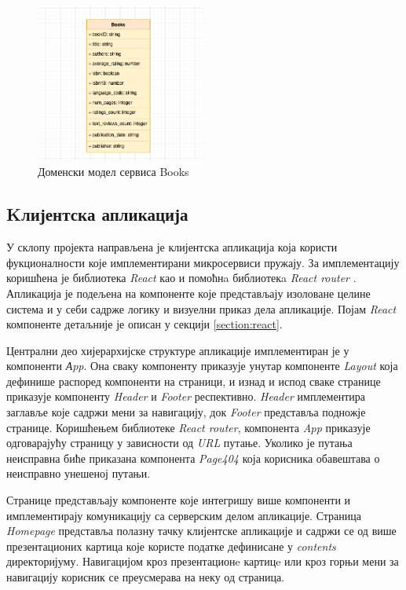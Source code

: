 \documentclass[12pt,oneside]{memoir}
\begin{document}
\begin{figure}[!ht]
  \centering
  \includegraphics[width=0.5\textwidth]{matfmaster/img/booksShema.png}
  \caption{Доменски модел сервиса Books}
  \label{fig:booksShema}
\end{figure}
\newpage

\newpage


\subsection{Kлијентска апликација}

У склопу пројекта направљена је клијентска апликација која користи фукционалности које имплементирани микросервиси пружају. За имплементацију коришћена је библиотека \textit{React} као и помоћнa библиотекa \textit{React router} \cite{reactRouter}. Апликација је подељена на компоненте које представљају изоловане целине система и у себи садрже логику и визуелни приказ дела апликације. Појам \textit{React} компоненте детаљније је описан у секцији \ref{section:react}.

Централни део хијерархијске структуре апликације имплементиран је у компоненти \textit{Аpp}. Она сваку компоненту приказује унутар компоненте \textit{Layout} која дефинише распоред компоненти на страници, и изнад и испод сваке странице приказује компоненту \textit{Header} и \textit{Footer} респективно. \textit{Header} имплементира заглавље које садржи мени за навигацију, док \textit{Footer} представља подножје странице. Коришћењем библиотеке \textit{React router}, компонента \textit{App} приказује одговарајућу страницу у зависности од \textit{URL} путање. Уколико је путања неисправна биће приказана компонента \textit{Page404} која корисника обавештава о неисправно унешеној путањи.  

Странице представљају компоненте које интегришу више компоненти и имплементирају комуникацију са серверским делом апликације. Страница \textit{Homepage} представља полазну тачку клијентске апликације и садржи се од више презентационих картица које користе податке дефинисане у \textit{contents} директоријуму. Навигацијом кроз презентационe картицe или кроз горњи мени за навигацију корисник се преусмерава на неку од страница. 
\end{document}
